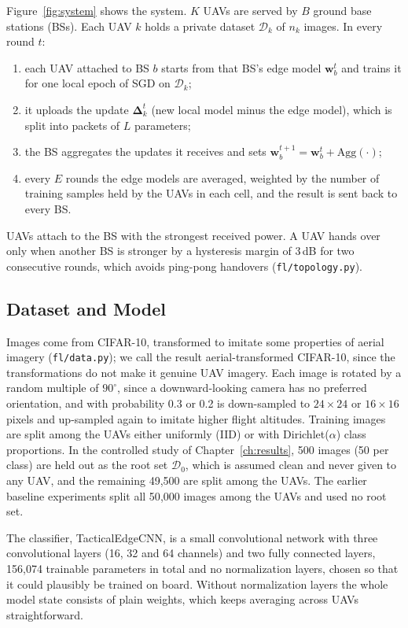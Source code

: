 Figure~\ref{fig:system} shows the system. $K$ UAVs are served by $B$ ground base
stations (BSs). Each UAV $k$ holds a private dataset $\mathcal{D}_k$ of $n_k$ images.
In every round $t$:
\begin{enumerate}
\item each UAV attached to BS $b$ starts from that BS's edge model $\mathbf{w}^t_b$
  and trains it for one local epoch of SGD on $\mathcal{D}_k$;
\item it uploads the update $\boldsymbol{\Delta}^t_k$ (new local model minus the edge
  model), which is split into packets of $L$ parameters;
\item the BS aggregates the updates it receives and sets
  $\mathbf{w}^{t+1}_b=\mathbf{w}^t_b+\mathrm{Agg}(\cdot)$;
\item every $E$ rounds the edge models are averaged, weighted by the number of
  training samples held by the UAVs in each cell, and the result is sent back to
  every BS.
\end{enumerate}
UAVs attach to the BS with the strongest received power. A UAV hands over only when
another BS is stronger by a hysteresis margin of 3\,dB for two consecutive rounds,
which avoids ping-pong handovers (\texttt{fl/topology.py}).

\subsection{Dataset and Model}
Images come from CIFAR-10, transformed to imitate some properties of aerial imagery
(\texttt{fl/data.py}); we call the result aerial-transformed CIFAR-10, since the
transformations do not make it genuine UAV imagery. Each image is rotated by a random multiple of
$90^\circ$, since a downward-looking camera has no preferred orientation, and with
probability 0.3 or 0.2 is down-sampled to $24\times24$ or $16\times16$ pixels and
up-sampled again to imitate higher flight altitudes. Training images are split among
the UAVs either uniformly (IID) or with Dirichlet($\alpha$) class proportions. In the
controlled study of Chapter~\ref{ch:results}, 500 images (50 per class) are held out as
the root set $\mathcal{D}_0$, which is assumed clean and never given to any UAV, and
the remaining 49{,}500 are split among the UAVs. The earlier baseline experiments
split all 50{,}000 images among the UAVs and used no root set.

The classifier, TacticalEdgeCNN, is a small convolutional network with three
convolutional layers (16, 32 and 64 channels) and two fully connected layers,
156{,}074 trainable parameters in total and no normalization layers, chosen so that it
could plausibly be trained on board. Without normalization layers the whole model
state consists of plain weights, which keeps averaging across UAVs straightforward.

